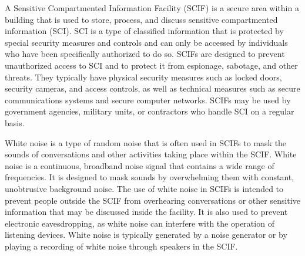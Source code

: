 A Sensitive Compartmented Information Facility (SCIF) is a secure area within a building that is used to store, process, and discuss sensitive compartmented information (SCI). SCI is a type of classified information that is protected by special security measures and controls and can only be accessed by individuals who have been specifically authorized to do so. SCIFs are designed to prevent unauthorized access to SCI and to protect it from espionage, sabotage, and other threats. They typically have physical security measures such as locked doors, security cameras, and access controls, as well as technical measures such as secure communications systems and secure computer networks. SCIFs may be used by government agencies, military units, or contractors who handle SCI on a regular basis.

White noise is a type of random noise that is often used in SCIFs to mask the sounds of conversations and other activities taking place within the SCIF. White noise is a continuous, broadband noise signal that contains a wide range of frequencies. It is designed to mask sounds by overwhelming them with constant, unobtrusive background noise. The use of white noise in SCIFs is intended to prevent people outside the SCIF from overhearing conversations or other sensitive information that may be discussed inside the facility. It is also used to prevent electronic eavesdropping, as white noise can interfere with the operation of listening devices. White noise is typically generated by a noise generator or by playing a recording of white noise through speakers in the SCIF.
